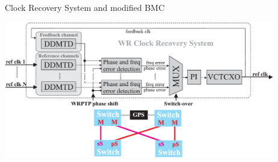 \documentclass[compress,red]{beamer}
\begin{document}
\begin{frame}{Clock Recovery System and modified BMC}


  \begin{center}
  \includegraphics[width=11.8cm]{protocol/wrCRS_plus_mBMC.pdf}
  \end{center}

\end{frame}
\end{document}
